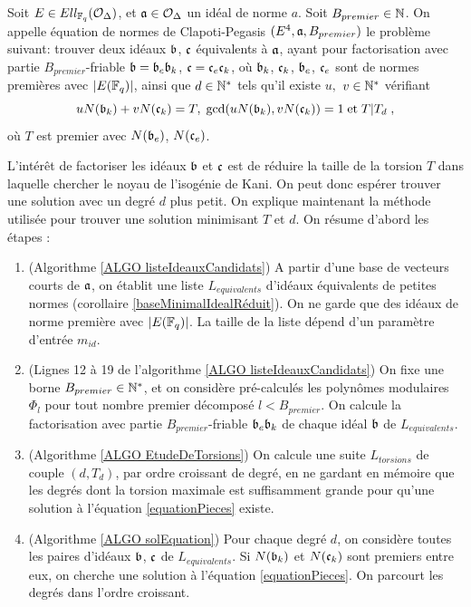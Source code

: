 \begin{Def}
	Soit $E\in Ell_{\mathbb{F}_{q}}(\mathcal{O}_{\Delta})$, et $\mathfrak{a}\in\mathcal{O}_{\Delta}$ un idéal de norme $a$. Soit $B_{premier}\in\mathbb{N}$. On appelle équation de normes de Clapoti-Pegasis $(E^4,\mathfrak{a},B_{premier})$ le problème suivant: trouver deux idéaux $\mathfrak{b}$, $\mathfrak{c}$ équivalents à $\mathfrak{a}$, ayant pour factorisation avec partie $B_{premier}$-friable $\mathfrak{b} = \mathfrak{b}_e\mathfrak{b}_k$, $\mathfrak{c} = \mathfrak{c}_e\mathfrak{c}_k$, où $\mathfrak{b}_k$, $\mathfrak{c}_k$, $\mathfrak{b}_e$, $\mathfrak{c}_e$ sont de normes premières avec $|E(\mathbb{F}_{q})|$, ainsi que $d\in\mathbb{N}^*$ tels qu'il existe $u,$ $v\in\mathbb{N}^*$ vérifiant 
	\begin{equation}\label{equationPieces}
		uN(\mathfrak{b}_k) + vN(\mathfrak{c}_k) = T,\;\gcd(uN(\mathfrak{b}_k),vN(\mathfrak{c}_k)) = 1\;\mbox{et}\; T|T_{d} \;,
	\end{equation}
	où $T$ est premier avec $N(\mathfrak{b}_e)$, $N(\mathfrak{c}_e)$.  
\end{Def}

L'intérêt de factoriser les idéaux $\mathfrak{b}$ et $\mathfrak{c}$ est de réduire la taille de la torsion $T$ dans laquelle chercher le noyau de l'isogénie de Kani. On peut donc espérer trouver une solution avec un degré $d$ plus petit. On explique maintenant la méthode utilisée pour trouver une solution minimisant $T$ et $d$. On résume d'abord les étapes :

\begin{enumerate}
	\item (Algorithme \ref{ALGO listeIdeauxCandidats}) A partir d'une base de vecteurs courts de $\mathfrak{a}$, on établit une liste $L_{equivalents}$ d'idéaux équivalents de petites normes (corollaire \ref{baseMinimalIdealRéduit}). On ne garde que des idéaux de norme première avec $|E(\mathbb{F}_{q})|$. La taille de la liste dépend d'un paramètre d'entrée $m_{id}$. 
	\item (Lignes 12 à 19 de l'algorithme \ref{ALGO listeIdeauxCandidats}) On fixe une borne $B_{premier}\in\mathbb{N}^*$, et on considère pré-calculés les polynômes modulaires $\Phi_l$ pour tout nombre premier décomposé $l < B_{premier}$. On calcule la factorisation avec partie $B_{premier}$-friable $\mathfrak{b}_e\mathfrak{b}_k$ de chaque idéal $\mathfrak{b}$ de $L_{equivalents}$.
	\item (Algorithme \ref{ALGO EtudeDeTorsions}) On calcule une suite $L_{torsions}$ de couple $(d,T_d)$, par ordre croissant de degré, en ne gardant en mémoire que les degrés dont la torsion maximale est suffisamment grande pour qu'une solution à l'équation \eqref{equationPieces} existe.
	\item (Algorithme \ref{ALGO solEquation}) Pour chaque degré $d$, on considère toutes les paires d'idéaux $\mathfrak{b}$, $\mathfrak{c}$ de $L_{equivalents}$. Si $N(\mathfrak{b}_k)$ et $N(\mathfrak{c}_k)$ sont premiers entre eux, on cherche une solution à l'équation \eqref{equationPieces}. On parcourt les degrés dans l'ordre croissant. 
\end{enumerate}

